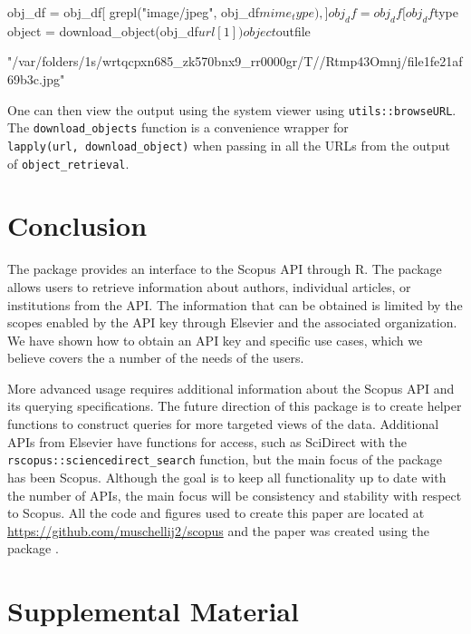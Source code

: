 \begin{Schunk}
\begin{Sinput}
obj_df = obj_df[ grepl("image/jpeg", obj_df$mime_type),]
obj_df = obj_df[ obj_df$type %
object = download_object(obj_df$url[1])
object$outfile
\end{Sinput}
\begin{Soutput}
[1] "/var/folders/1s/wrtqcpxn685_zk570bnx9_rr0000gr/T//Rtmp43Omnj/file1fe21af69b3c.jpg"
\end{Soutput}
\end{Schunk}

One can then view the output using the system viewer using
\texttt{utils::browseURL}. The \texttt{download\_objects} function is a
convenience wrapper for \texttt{lapply(url,\ download\_object)} when
passing in all the URLs from the output of \texttt{object\_retrieval}.

\hypertarget{conclusion}{%
\section{Conclusion}\label{conclusion}}

The  package provides an interface to the Scopus API
through R. The package allows users to retrieve information about
authors, individual articles, or institutions from the API. The
information that can be obtained is limited by the scopes enabled by the
API key through Elsevier and the associated organization. We have shown
how to obtain an API key and specific use cases, which we believe covers
the a number of the needs of the users.

More advanced usage requires additional information about the Scopus API
and its querying specifications. The future direction of this package is
to create helper functions to construct queries for more targeted views
of the data. Additional APIs from Elsevier have functions for access,
such as SciDirect with the \texttt{rscopus::sciencedirect\_search}
function, but the main focus of the package has been Scopus. Although
the goal is to keep all functionality up to date with the number of
APIs, the main focus will be consistency and stability with respect to
Scopus. All the code and figures used to create this paper are located
at \url{https://github.com/muschellij2/scopus} and the paper was created
using the  package \citep{rticles}.

\hypertarget{supplemental-material}{%
\section{Supplemental Material}\label{supplemental-material}}

